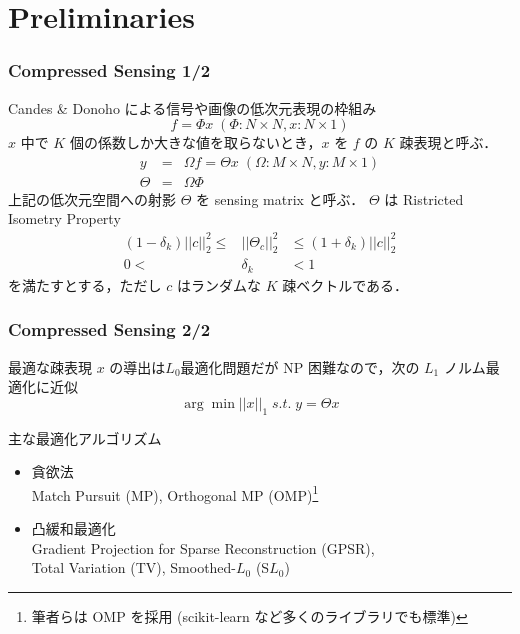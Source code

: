 \section{Preliminaries}


\begin{frame}\frametitle{Compressed Sensing 1/2}
Candes \& Donoho による信号や画像の低次元表現の枠組み
\begin{equation}
    f = \Phi x \; (\Phi: N \times N, x: N \times 1)
\end{equation}
$x$ 中で $K$ 個の係数しか大きな値を取らないとき，$x$ を $f$ の $K$ 疎表現と呼ぶ．
\begin{eqnarray}
    y & = & \Omega f = \Theta x \; (\Omega: M \times N, y: M \times 1) \\
    \Theta & = & \Omega \Phi
\end{eqnarray}
上記の低次元空間への射影 $\Theta$ を sensing matrix と呼ぶ．
$\Theta$ は Ristricted Isometry Property
\begin{eqnarray}
    (1 - \delta_k) ||c||^2_2 \leq & || \Theta_c ||^2_2 & \leq (1 + \delta_k) ||c||^2_2 \\
    0 < & \delta_k & < 1
\end{eqnarray}
を満たすとする，ただし $c$ はランダムな $K$ 疎ベクトルである．
\end{frame}


\begin{frame}\frametitle{Compressed Sensing 2/2}
最適な疎表現 $x$ の導出は$L_0$最適化問題だが NP 困難なので，次の $L_1$ ノルム最適化に近似
\begin{equation}
    \arg\min ||x||_1 \; s.t. \; y = \Theta x
\end{equation}
\begin{block}{主な最適化アルゴリズム}
\begin{itemize}
    \item 貪欲法\\
        Match Pursuit (MP),
        Orthogonal MP (OMP)\footnote{筆者らは OMP を採用 (scikit-learn など多くのライブラリでも標準)}

    \item 凸緩和最適化\\
        Gradient Projection for Sparse Reconstruction (GPSR),\\
        Total Variation (TV),
        Smoothed-$L_0$ (S$L_0$)
\end{itemize}
\end{block}
\end{frame}


